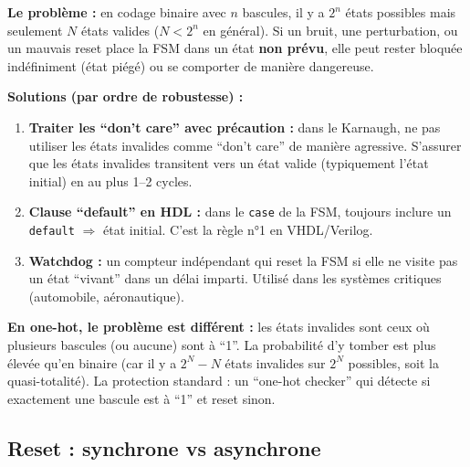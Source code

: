 \documentclass[12pt,a4paper,twoside]{book}
\begin{document}
\begin{attention}
\textbf{Le problème :} en codage binaire avec $n$ bascules, il y a $2^n$ états possibles mais seulement $N$ états valides ($N < 2^n$ en général). Si un bruit, une perturbation, ou un mauvais reset place la FSM dans un état \textbf{non prévu}, elle peut rester bloquée indéfiniment (état piégé) ou se comporter de manière dangereuse.

\textbf{Solutions (par ordre de robustesse) :}
\begin{enumerate}[nosep]
\item \textbf{Traiter les ``don't care'' avec précaution :} dans le Karnaugh, ne pas utiliser les états invalides comme ``don't care'' de manière agressive. S'assurer que les états invalides transitent vers un état valide (typiquement l'état initial) en au plus 1--2 cycles.
\item \textbf{Clause ``default'' en HDL :} dans le \texttt{case} de la FSM, toujours inclure un \texttt{default} $\Rightarrow$ état initial. C'est la règle n°1 en VHDL/Verilog.
\item \textbf{Watchdog :} un compteur indépendant qui reset la FSM si elle ne visite pas un état ``vivant'' dans un délai imparti. Utilisé dans les systèmes critiques (automobile, aéronautique).
\end{enumerate}
\end{attention}

\begin{intuition}
\textbf{En one-hot, le problème est différent :} les états invalides sont ceux où plusieurs bascules (ou aucune) sont à ``1''. La probabilité d'y tomber est plus élevée qu'en binaire (car il y a $2^N - N$ états invalides sur $2^N$ possibles, soit la quasi-totalité). La protection standard : un ``one-hot checker'' qui détecte si exactement une bascule est à ``1'' et reset sinon.
\end{intuition}

\subsection{Reset : synchrone vs asynchrone}
\end{document}
